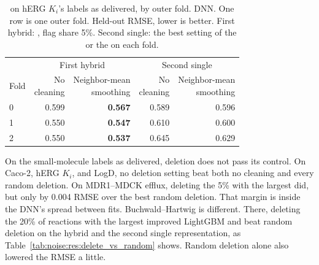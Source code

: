 \begin{table}[htbp]
\centering
\begin{tabular}{@{}lrrrr@{}}
\toprule
 & \multicolumn{2}{c}{First hybrid} & \multicolumn{2}{c}{Second single} \\
\cmidrule(lr){2-3}\cmidrule(l){4-5}
Fold & \makecell[r]{No\\cleaning} & \makecell[r]{Neighbor-mean\\smoothing} & \makecell[r]{No\\cleaning} & \makecell[r]{Neighbor-mean\\smoothing} \\
\midrule
0 & 0.599 & \textbf{0.567} & 0.589 & 0.596 \\
1 & 0.550 & \textbf{0.547} & 0.610 & 0.600 \\
2 & 0.550 & \textbf{0.537} & 0.645 & 0.629 \\
\bottomrule
\end{tabular}
\caption[Neighbor-mean smoothing on hERG $K_i$ by fold.]{ on hERG $K_i$'s labels as delivered, by outer fold. DNN. One row is one outer fold. Held-out RMSE, lower is better. First hybrid: , flag share 5\%. Second single: the best setting of the  or the  on each fold.}
\label{tab:noise:res:hergki_smoothing_folds}
\end{table}

On the small-molecule labels as delivered, deletion does not pass its control. On Caco-2, hERG $K_i$, and LogD, no deletion setting beat both no cleaning and every random deletion. On MDR1--MDCK efflux, deleting the 5\% with the largest  did, but only by 0.004 RMSE over the best random deletion. That margin is inside the DNN's spread between fits. Buchwald--Hartwig is different. There, deleting the 20\% of reactions with the largest  improved LightGBM and beat random deletion on the hybrid and the second single representation, as Table~\ref{tab:noise:res:delete_vs_random} shows. Random deletion alone also lowered the RMSE a little.

